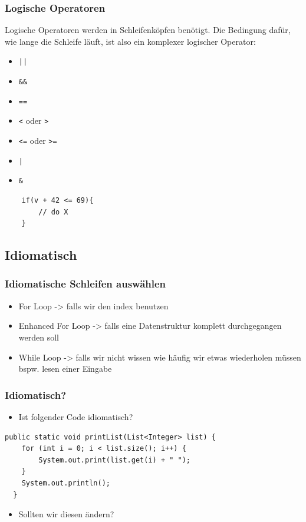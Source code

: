 \begin{frame}[fragile]
\frametitle{Logische Operatoren}
Logische Operatoren werden in Schleifenköpfen benötigt. Die Bedingung dafür, wie lange die Schleife läuft, ist also ein komplexer logischer Operator:
\begin{itemize}
    \item \texttt{||}
    \item \texttt{\&\&}
    \item \texttt{==}
    \item \texttt{<} oder \texttt{>}
    \item \texttt{<=} oder \texttt{>=}
    \item \texttt{|}
    \item \texttt{\&}
\end{itemize}
\begin{lstlisting}
    if(v + 42 <= 69){
        // do X
    }
\end{lstlisting}
\end{frame}

\subsection{Idiomatisch}

\begin{frame}[fragile]
\frametitle{Idiomatische Schleifen auswählen}
\begin{itemize}
    \item For Loop -> falls wir den index benutzen
    \item Enhanced For Loop -> falls eine Datenstruktur komplett durchgegangen werden soll
    \item While Loop -> falls wir nicht wissen wie häufig wir etwas wiederholen müssen bspw. lesen einer Eingabe
\end{itemize}
\end{frame}

\begin{frame}[fragile]
\frametitle{Idiomatisch?}
\begin{itemize}
    \item Ist folgender Code idiomatisch?
\end{itemize}
\begin{lstlisting}
public static void printList(List<Integer> list) {
    for (int i = 0; i < list.size(); i++) {
        System.out.print(list.get(i) + " ");
    }
    System.out.println();
  }
\end{lstlisting}

\begin{itemize}
    \item Sollten wir diesen ändern?
\end{itemize}
\end{frame}

